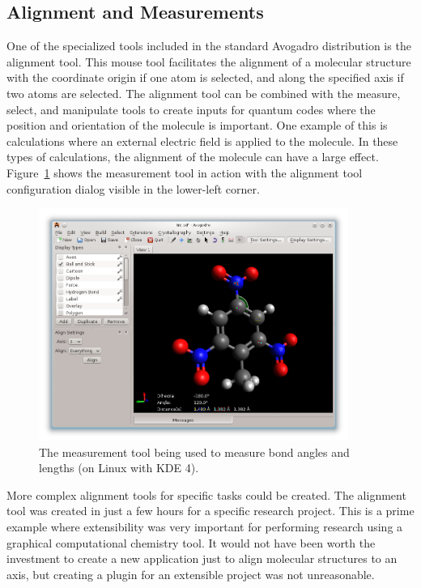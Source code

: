 \documentclass[10pt]{bmc_article}
\newenvironment{bmcformat}{\begin{raggedright}
\baselineskip20pt\sloppy\setboolean{publ}{false}}{\end{raggedright}
\baselineskip20pt\sloppy}
\begin{document}
\begin{bmcformat}
\subsection{Alignment and Measurements}

One of the specialized tools included in the standard Avogadro distribution is
the alignment tool. This mouse tool facilitates the alignment of a molecular
structure with the coordinate origin if one atom is selected, and along the
specified axis if two atoms are selected. The alignment tool can be combined
with the measure, select, and manipulate tools to create inputs for
quantum codes where the position and orientation of the molecule is important.
One example of this is calculations where an external electric field is applied
to the molecule. In these types of calculations, the alignment of the molecule
can have a large effect. Figure~\ref{f:measurement} shows the measurement tool
in action with the alignment tool configuration dialog visible in the lower-left
corner.

\begin{figure}
  \begin{center}
    \includegraphics[width=0.9\textwidth]{images/avogadro-measurement}
  \end{center}
  \caption{The measurement tool being used to measure bond angles and lengths
  (on Linux with KDE 4).}
  \label{f:measurement}
\end{figure}

More complex alignment tools for specific tasks could be created. The alignment
tool was created in just a few hours for a specific research project. This is a prime
example where extensibility was very important for performing
research using a graphical computational chemistry tool. It would not have been
worth the investment to create a new application just to align molecular
structures to an axis, but creating a plugin for an extensible project was not
unreasonable.



\end{bmcformat}
\end{document}
